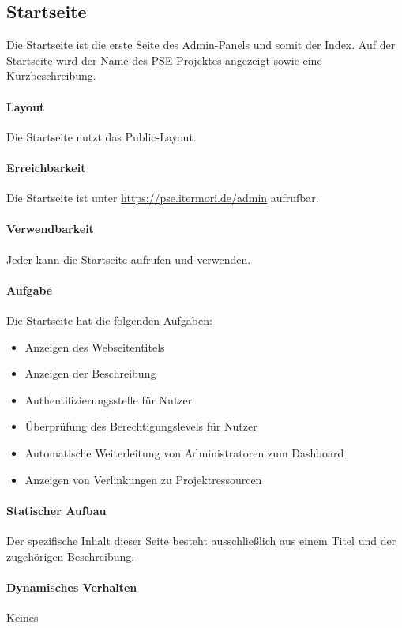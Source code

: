 \subsection{Startseite}

Die Startseite ist die erste Seite des Admin-Panels und somit der Index.
Auf der Startseite wird der Name des PSE-Projektes angezeigt sowie eine Kurzbeschreibung.

\paragraph{Layout}
Die Startseite nutzt das Public-Layout.

\paragraph*{Erreichbarkeit}
Die Startseite ist unter \href{https://pse.itermori.de/admin}{https://pse.itermori.de/admin} aufrufbar.

\paragraph*{Verwendbarkeit}
Jeder kann die Startseite aufrufen und verwenden.

\paragraph{Aufgabe}
Die Startseite hat die folgenden Aufgaben:

\begin{itemize}
    \item Anzeigen des Webseitentitels
    \item Anzeigen der Beschreibung
    \item Authentifizierungsstelle für Nutzer
    \item Überprüfung des Berechtigungslevels für Nutzer
    \item Automatische Weiterleitung von Administratoren zum Dashboard
    \item Anzeigen von Verlinkungen zu Projektressourcen
\end{itemize}

\paragraph*{Statischer Aufbau}
Der spezifische Inhalt dieser Seite besteht ausschließlich aus einem Titel und der zugehörigen Beschreibung.

\paragraph*{Dynamisches Verhalten}
Keines